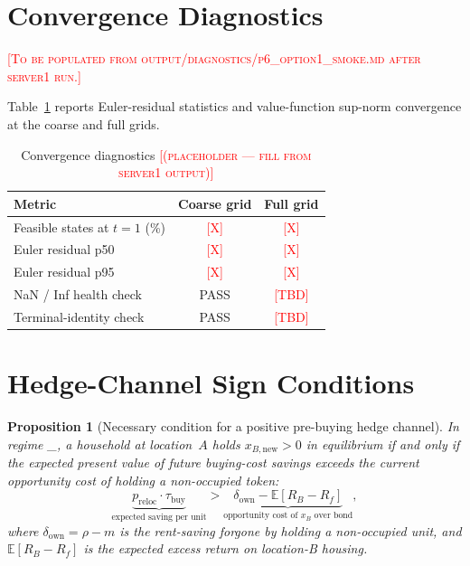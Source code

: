 \documentclass[12pt]{article}
\newtheorem{proposition}{Proposition}
\theoremstyle{definition}
\theoremstyle{remark}
\newcommand{\ph}[1]{\textcolor{red}{\textsc{[#1]}}}
\newcommand{\taubuy}{\tau_{\mathrm{buy}}}
\newcommand{\EtwosubTwoL}{\text{E2}_{\text{2L}}}
\begin{document}
\begin{appendices}
\section{Convergence Diagnostics}
\label{app:convergence}

\ph{To be populated from output/diagnostics/p6\_option1\_smoke.md after server1 run.}

Table~\ref{tab:convergence} reports Euler-residual statistics and
value-function sup-norm convergence at the coarse and full grids.

\begin{table}[h]
\centering
\caption{Convergence diagnostics \ph{(placeholder — fill from server1 output)}}
\label{tab:convergence}
\begin{tabular}{lcc}
\toprule
Metric & Coarse grid & Full grid \\
\midrule
Feasible states at $t=1$ (\%) & \ph{X} & \ph{X} \\
Euler residual p50             & \ph{X} & \ph{X} \\
Euler residual p95             & \ph{X} & \ph{X} \\
NaN / Inf health check         & PASS   & \ph{TBD} \\
Terminal-identity check        & PASS   & \ph{TBD} \\
\bottomrule
\end{tabular}
\end{table}

\section{Hedge-Channel Sign Conditions}
\label{app:sign}

\begin{proposition}[Necessary condition for a positive pre-buying hedge channel]
\label{prop:sign}
In regime \EtwosubTwoL, a household at location~$A$ holds $x_{B,\text{new}} > 0$
in equilibrium if and only if the expected present value of future buying-cost
savings exceeds the current opportunity cost of holding a non-occupied token:
\begin{equation}
  \underbrace{p_{\text{reloc}} \cdot \taubuy}_{\text{expected saving per unit}}
  >
  \underbrace{\delta_{\text{own}} - \mathbb{E}[R_B - R_f]}_{\text{opportunity cost of }x_B \text{ over bond}},
  \label{eq:sign_condition}
\end{equation}
where $\delta_{\text{own}} = \rho - m$ is the rent-saving forgone by holding a
non-occupied unit, and $\mathbb{E}[R_B - R_f]$ is the expected excess return
on location-B housing.
\end{proposition}


\end{appendices}
\end{document}
